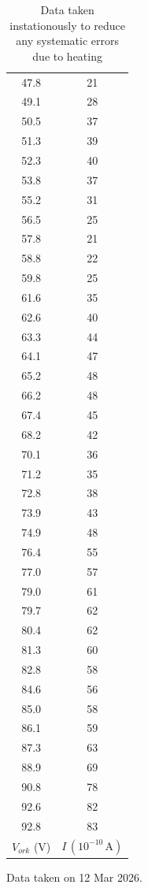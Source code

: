 \documentclass[%
sor,
 jor,
 amsmath,amssymb,
 reprint,
longbibliography,
]{revtex4-2}
\begin{document}
\begin{table}[H]
\begin{minipage}[t]{0.48\textwidth}
\centering
\begin{tabular}{|c|c|}
47.8 & 21 \\
49.1 & 28 \\
50.5 & 37 \\
51.3 & 39 \\
52.3 & 40 \\
53.8 & 37 \\
55.2 & 31 \\
56.5 & 25 \\
57.8 & 21 \\
58.8 & 22 \\
59.8 & 25 \\
61.6 & 35 \\
62.6 & 40 \\
63.3 & 44 \\
64.1 & 47 \\
65.2 & 48 \\
66.2 & 48 \\
67.4 & 45 \\
68.2 & 42 \\
70.1 & 36 \\
71.2 & 35 \\
72.8 & 38 \\
73.9 & 43 \\
74.9 & 48 \\
76.4 & 55 \\
77.0 & 57 \\
79.0 & 61 \\
79.7 & 62 \\
80.4 & 62 \\ 
81.3 & 60 \\
82.8 & 58 \\
84.6 & 56 \\
85.0 & 58 \\
86.1 & 59 \\
87.3 & 63 \\
88.9 & 69 \\
90.8 & 78 \\
92.6 & 82 \\
92.8 & 83 \\
\hline
$V_{ork}$ (V) & $I\,(10^{-10}\,\mathrm{A})$ \\
\hline
\end{tabular}
\end{minipage}
\caption{Data taken instationously to reduce any systematic errors due to heating}
\end{table}
\begin{center}
	Data taken on 12 Mar 2026.
\end{center}
\end{document}
